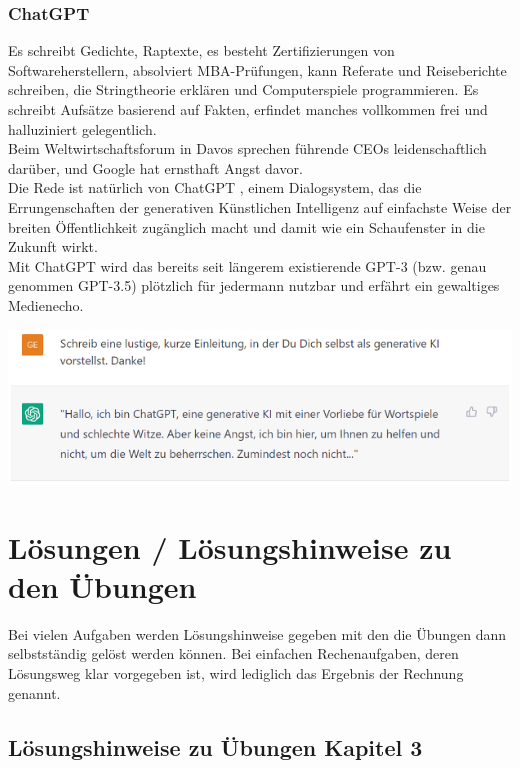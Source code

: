 \documentclass[12pt]{article}
\begin{document}
\subsubsection{ChatGPT}
%
Es schreibt Gedichte, Raptexte, es besteht Zertifizierungen von Softwareherstellern, absolviert MBA-Prüfungen, kann Referate und Reiseberichte schreiben, die Stringtheorie erklären und Computerspiele programmieren. Es schreibt Aufsätze basierend auf Fakten, erfindet manches vollkommen frei und halluziniert gelegentlich. \\
Beim Weltwirtschaftsforum in Davos sprechen führende CEOs leidenschaftlich darüber, und Google hat ernsthaft Angst davor.\\
%
Die Rede ist natürlich von ChatGPT , einem Dialogsystem, das die Errungenschaften der generativen Künstlichen Intelligenz auf einfachste Weise der breiten Öffentlichkeit zugänglich macht und damit wie ein Schaufenster in die Zukunft wirkt. \\
Mit ChatGPT wird das bereits seit längerem existierende GPT-3 (bzw.
genau genommen GPT-3.5) plötzlich für jedermann nutzbar und erfährt ein gewaltiges Medienecho.
%
\begin{center}
\includegraphics{ChatGPT-Text1} 
\end{center}
%
\newpage

\section{Lösungen / Lösungshinweise zu den Übungen \\}

Bei vielen Aufgaben werden Lösungshinweise gegeben mit den die Übungen dann selbstständig gelöst werden können. Bei einfachen Rechenaufgaben, deren Lösungsweg klar vorgegeben ist, wird lediglich das Ergebnis der Rechnung genannt.\\

\subsection{Lösungshinweise zu Übungen Kapitel 3}
\end{document}
